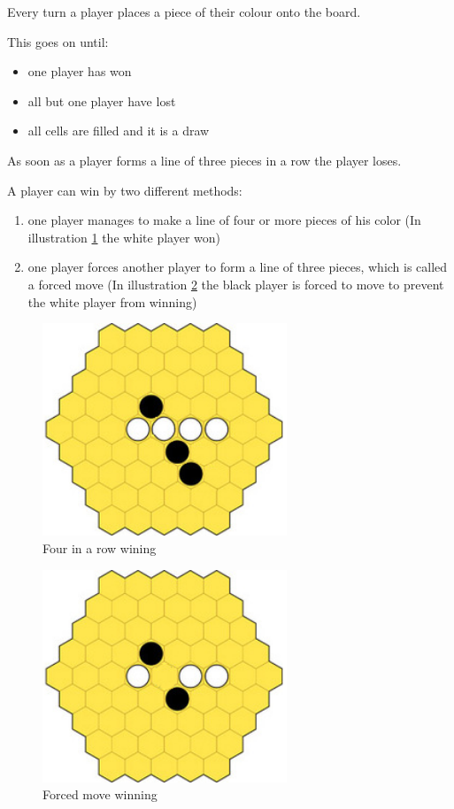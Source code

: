 \documentclass[english]{report}
\begin{document}
Every turn a player places a piece of their colour onto the board. 

This goes on until:
\begin{itemize}
	\item one player has won
	\item all but one player have lost
	\item all cells are filled and it is a draw
\end{itemize}

As soon as a player forms a line of three pieces in a row the player loses.

A player can win by two different methods:
\begin{enumerate}
	\item one player manages to make a line of four or more pieces of his color (In illustration  \ref{fig:yav_4inarow} the white player won)
	\item one player forces another player to form a line of three pieces, which is called a forced move (In illustration  \ref{fig:yav_forceMove} the black player is forced to move to prevent the white player from winning)
\end{enumerate}

\begin{figure}[H]
\centering
\includegraphics[width=0.65\textwidth]{Abbildungen/yav_4inarow.png}
\caption[Four in a row winning, Source:\cite{yvalath}]{Four in a row wining}
\label{fig:yav_4inarow}
\end{figure}


\begin{figure}[H]
\centering
\includegraphics[width=0.65\textwidth]{Abbildungen/yav_forceMove.png}
\caption[Forced move winning, Source:\cite{yvalath}]{Forced move winning}
\label{fig:yav_forceMove}
\end{figure}
\end{document}
